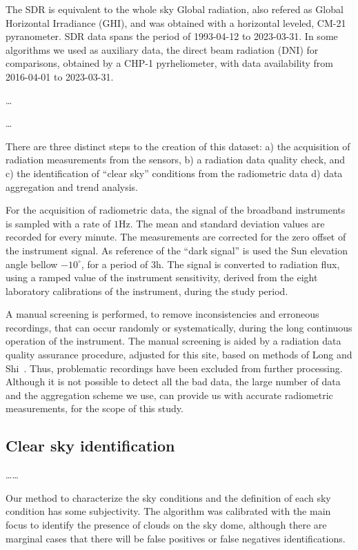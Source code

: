 \documentclass[preprint, 3p,
authoryear]{elsarticle} %
\begin{document}
The SDR is equivalent to the whole sky Global radiation, also refered as
Global Horizontal Irradiance (GHI), and was obtained with a horizontal
leveled, CM-21 pyranometer. SDR data spans the period of 1993-04-12 to
2023-03-31. In some algorithms we used as auxiliary data, the direct
beam radiation (DNI) for comparisons, obtained by a CHP-1 pyrheliometer,
with data availability from 2016-04-01 to 2023-03-31.

\ldots{}

\ldots{}

There are three distinct steps to the creation of this dataset: a) the
acquisition of radiation measurements from the sensors, b) a radiation
data quality check, and c) the identification of ``clear sky''
conditions from the radiometric data d) data aggregation and trend
analysis.

For the acquisition of radiometric data, the signal of the broadband
instruments is sampled with a rate of \(1 \text{Hz}\). The mean and
standard deviation values are recorded for every minute. The
measurements are corrected for the zero offset of the instrument signal.
As reference of the ``dark signal'' is used the Sun elevation angle
bellow \(-10^\circ\), for a period of \(3 \text{h}\). The signal is
converted to radiation flux, using a ramped value of the instrument
sensitivity, derived from the eight laboratory calibrations of the
instrument, during the study period.

A manual screening is performed, to remove inconsistencies and erroneous
recordings, that can occur randomly or systematically, during the long
continuous operation of the instrument. The manual screening is aided by
a radiation data quality assurance procedure, adjusted for this site,
based on methods of Long and Shi~\citetext{\citealp[
]{Long2008a}; \citealp{Long2006}}. Thus, problematic recordings have
been excluded from further processing. Although it is not possible to
detect all the bad data, the large number of data and the aggregation
scheme we use, can provide us with accurate radiometric measurements,
for the scope of this study.

\hypertarget{clear-sky-identification}{%
\subsection{Clear sky identification}\label{clear-sky-identification}}

\ldots\ldots{}

Our method to characterize the sky conditions and the definition of each
sky condition has some subjectivity. The algorithm was calibrated with
the main focus to identify the presence of clouds on the sky dome,
although there are marginal cases that there will be false positives or
false negatives identifications.
\end{document}

